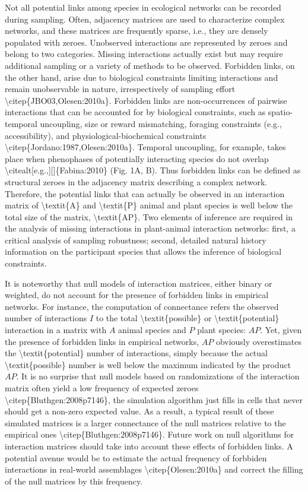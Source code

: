 \documentclass[a4paper,12pt]{article}
\begin{document}
\begin{spacing}{1.0}
Not all potential links among species in ecological networks can be recorded during sampling. Often, adjacency matrices are used to characterize complex networks, and these matrices are frequently sparse, i.e., they are densely populated with zeroes. Unobserved interactions are represented by zeroes and belong to two categories. Missing interactions actually exist but may require additional sampling or a variety of methods to be observed. Forbidden links, on the other hand, arise due to biological constraints limiting interactions and remain unobservable in nature, irrespectively of sampling effort \textbackslash{}citep\{JBO03,Olesen:2010a\}. Forbidden links are non-occurrences of pairwise interactions that can be accounted for by biological constraints, such as spatio-temporal uncoupling, size or reward mismatching, foraging constraints (e.g., accessibility), and physiological-biochemical constraints \textbackslash{}citep\{Jordano:1987,Olesen:2010a\}. Temporal uncoupling, for example, takes place when phenophases of potentially interacting species do not overlap \textbackslash{}citealt[e.g.,][]\{Fabina:2010\} (Fig. 1A, B). Thus forbidden links can be defined as structural zeroes in the adjacency matrix describing a complex network. Therefore, the potential links that can actually be observed in an interaction matrix of \textbackslash{}textit\{A\} and \textbackslash{}textit\{P\} animal and plant species is well below the total size of the matrix, \textbackslash{}textit\{AP\}. Two elements of inference are required in the analysis of missing interactions in plant-animal interaction networks: first, a critical analysis of sampling robustness; second, detailed natural history information on the participant species that allows the inference of biological constraints.

It is noteworthy that null models of interaction matrices, either binary or weighted, do not account for the presence of forbidden links in empirical networks. For instance, the computation of connectance refers the observed number of interactions $I$ to the total \textbackslash{}textit\{possible\} or \textbackslash{}textit\{potential\} interaction in a matrix with $A$ animal species and $P$ plant species: $AP$. Yet, given the presence of forbidden links in empirical networks, $AP$ obviously overestimates the \textbackslash{}textit\{potential\} number of interactions, simply because the actual \textbackslash{}textit\{possible\} number is well below the maximum indicated by the product $AP$. It is no surprise that null models based on randomizations of the interaction matrix often yield a low frequency of expected zeroes \textbackslash{}citep\{Bluthgen:2008p7146\}, the simulation algorithm just fills in cells that never should get a non-zero expected value. As a result, a typical result of these simulated matrices is a larger connectance of the null matrices relative to the empirical ones \textbackslash{}citep\{Bluthgen:2008p7146\}. Future work on null algorithms for interaction matrices should take into account these effects of forbidden links. A potential avenue would be to estimate the actual frequency of forbbiden interactions in real-world assemblages \textbackslash{}citep\{Olesen:2010a\} and correct the filling of the null matrices by this frequency.


\end{spacing}
\end{document}
